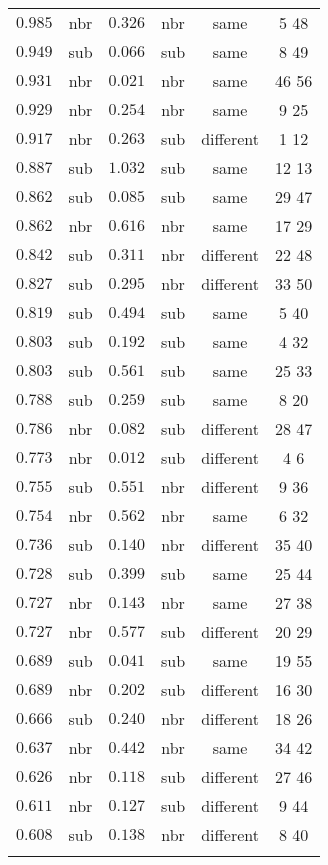 \begin{table}[!htbp]
\begin{tabular}{@{\extracolsep{5pt}} cccccc}
$0.985$ & nbr & $0.326$ & nbr & same & 5 48  \\ 
$0.949$ & sub & $0.066$ & sub & same & 8 49  \\ 
$0.931$ & nbr & $0.021$ & nbr & same & 46 56  \\ 
$0.929$ & nbr & $0.254$ & nbr & same & 9 25  \\ 
$0.917$ & nbr & $0.263$ & sub & different & 1 12  \\ 
$0.887$ & sub & $1.032$ & sub & same & 12 13  \\ 
$0.862$ & sub & $0.085$ & sub & same & 29 47  \\ 
$0.862$ & nbr & $0.616$ & nbr & same & 17 29  \\ 
$0.842$ & sub & $0.311$ & nbr & different & 22 48  \\ 
$0.827$ & sub & $0.295$ & nbr & different & 33 50  \\ 
$0.819$ & sub & $0.494$ & sub & same & 5 40  \\ 
$0.803$ & sub & $0.192$ & sub & same & 4 32  \\ 
$0.803$ & sub & $0.561$ & sub & same & 25 33  \\ 
$0.788$ & sub & $0.259$ & sub & same & 8 20  \\ 
$0.786$ & nbr & $0.082$ & sub & different & 28 47  \\ 
$0.773$ & nbr & $0.012$ & sub & different & 4 6  \\ 
$0.755$ & sub & $0.551$ & nbr & different & 9 36  \\ 
$0.754$ & nbr & $0.562$ & nbr & same & 6 32  \\ 
$0.736$ & sub & $0.140$ & nbr & different & 35 40  \\ 
$0.728$ & sub & $0.399$ & sub & same & 25 44  \\ 
$0.727$ & nbr & $0.143$ & nbr & same & 27 38  \\ 
$0.727$ & nbr & $0.577$ & sub & different & 20 29  \\ 
$0.689$ & sub & $0.041$ & sub & same & 19 55  \\ 
$0.689$ & nbr & $0.202$ & sub & different & 16 30  \\ 
$0.666$ & sub & $0.240$ & nbr & different & 18 26  \\ 
$0.637$ & nbr & $0.442$ & nbr & same & 34 42  \\ 
$0.626$ & nbr & $0.118$ & sub & different & 27 46  \\ 
$0.611$ & nbr & $0.127$ & sub & different & 9 44  \\ 
$0.608$ & sub & $0.138$ & nbr & different & 8 40  \\ 
\hline \\[-1.8ex] 
\end{tabular} 
\end{table} 
